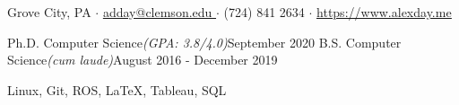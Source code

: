 \documentclass[letter]{article}
\begin{document}
    \vspace*{-40pt}

     {Grove City, PA $\cdot$ \href{mailto://adday@clemson.edu}{\underline{adday@clemson.edu }} $\cdot$ (724) 841 2634 $\cdot$ \href{https://www.alexday.me} {\underline{https://www.alexday.me}}}

         {Ph.D. Computer Science}{\textit{(GPA: 3.8/4.0)}}{September 2020}
        \vspace{\interspace}
         {B.S. Computer Science}{\textit{(cum laude)}}{August 2016 - December 2019}
        \vspace{\interspace}
    \vspace{-\interspace}



           {Linux, Git, ROS, \LaTeX, Tableau, SQL} 

\end{document}
